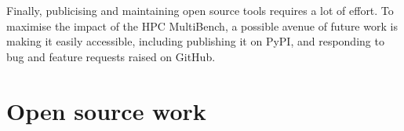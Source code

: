 Finally, publicising and maintaining open source tools requires a lot of effort. To maximise the impact of the HPC MultiBench, a possible avenue of future work is making it easily accessible, including publishing it on PyPI, and responding to bug and feature requests raised on GitHub.


\section{Open source work}
\label{sec:open-source-work} %


